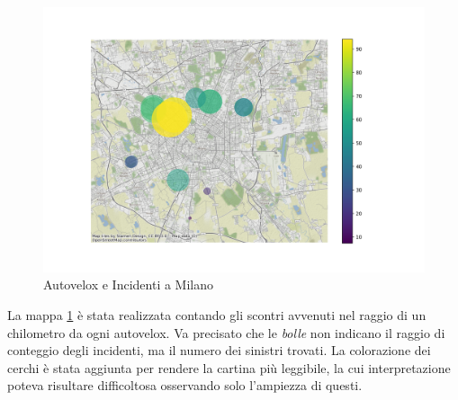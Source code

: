 \documentclass[a4paper,12pt]{report}
\newcommand{\quotestyle}[1]{\textit{#1}}
\begin{document}
\begin{figure}
    \includegraphics[width=\linewidth]{../src/autovelox/autovelox_incidenti.png}
    \caption{Autovelox e Incidenti a Milano}
    \label{fig:autovelox-incidenti}
\end{figure}

La mappa \ref{fig:autovelox-incidenti} è stata realizzata contando gli scontri avvenuti 
nel raggio di un chilometro da ogni autovelox. 
Va precisato che le \quotestyle{bolle} non indicano il raggio di conteggio degli incidenti, ma 
il numero dei sinistri trovati. 
La colorazione dei cerchi è stata aggiunta per 
rendere la cartina più leggibile, la cui interpretazione poteva risultare difficoltosa 
osservando solo l'ampiezza di questi. 
\end{document}
